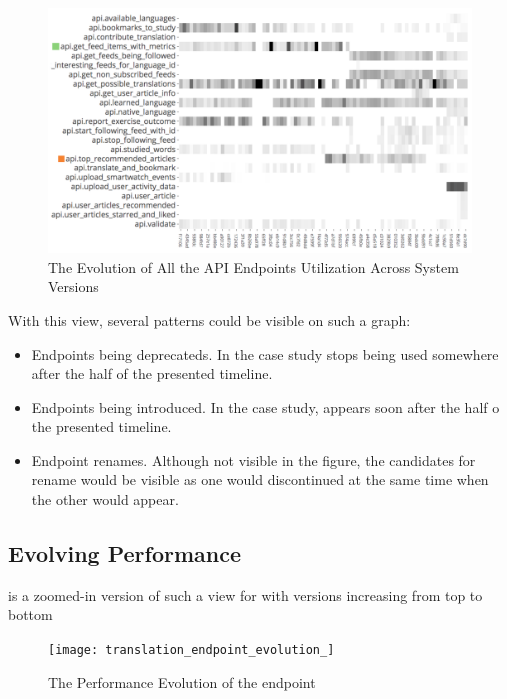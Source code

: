     \begin{figure}[h!]
      \centering
      \includegraphics[width=0.9\linewidth]{utilization-evolution}
      \caption{The Evolution of All the API Endpoints Utilization Across System Versions}
      \label{fig:mv-util}
    \end{figure}

  With this view, several patterns could be visible on such a graph:
  \begin{itemize}
    
    \item Endpoints being deprecateds. In the case study \epFeedItems stops being used somewhere after the half of the presented timeline.

    \item Endpoints being introduced. In the case study, \epTopArticles appears soon after the half o the presented timeline. 

    \item Endpoint renames. Although not visible in the figure, the candidates for rename would be visible as one would discontinued at the same time when the other would appear. 

  \end{itemize}


  \subsection*{Evolving Performance}

     is a zoomed-in version of such a view for \epTranslationsColor with versions increasing from top to bottom

    \begin{figure}[h!]
      \centering
      \texttt{[image: translation\_endpoint\_evolution\_]}
      \caption{The Performance Evolution of the \epTranslations endpoint}
      \label{fig:tee}
    \end{figure}


